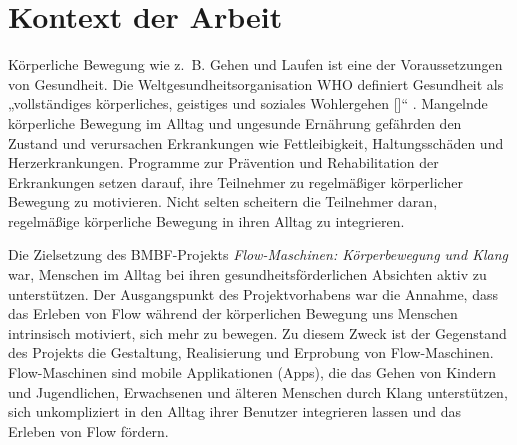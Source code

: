 

\section{Kontext der Arbeit} 

\label{sec:kontext_der_arbeit}

Körperliche Bewegung wie z.~B. Gehen und Laufen ist eine der Voraussetzungen von Gesundheit. Die Weltgesundheitsorganisation WHO definiert Gesundheit als „vollständiges körperliches, geistiges und soziales Wohlergehen [\textellipsis]“ \citep[S.~100]{WorldHealthOrganization1948}. Mangelnde körperliche Bewegung im Alltag und ungesunde Ernährung gefährden den Zustand und verursachen Erkrankungen wie Fettleibigkeit, Haltungsschäden und Herzerkrankungen. Programme zur Prävention und Rehabilitation der Erkrankungen setzen darauf, ihre Teilnehmer zu regelmäßiger körperlicher Bewegung zu motivieren. Nicht selten scheitern die Teilnehmer daran, regelmäßige körperliche Bewegung in ihren Alltag zu integrieren.

Die Zielsetzung des \acs{BMBF}-Projekts \emph{Flow-Maschinen: Körperbewegung und Klang} war, Menschen im Alltag bei ihren gesundheitsförderlichen Absichten aktiv zu unterstützen. Der Ausgangspunkt des Projektvorhabens war die Annahme, dass das Erleben von Flow während der körperlichen Bewegung uns Menschen intrinsisch motiviert, sich mehr zu bewegen. Zu diesem Zweck ist der Gegenstand des Projekts die Gestaltung, Realisierung und Erprobung von Flow-Maschinen. Flow-Maschinen sind mobile Applikationen (Apps), die das Gehen von Kindern und Jugendlichen, Erwachsenen und älteren Menschen durch Klang unterstützen, sich unkompliziert in den Alltag ihrer Benutzer integrieren lassen und das Erleben von Flow fördern.

